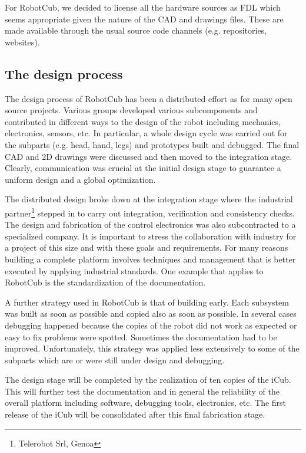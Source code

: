 For RobotCub, we decided to license all the hardware sources as FDL which seems
appropriate given the nature of the CAD and drawings files. These are made 
available through the usual source code channels (e.g. repositories, websites).

\subsection{The design process}
The design process of RobotCub has been a distributed effort as for many open
source projects. Various groups developed various subcomponents and contributed in
different ways to the design of the robot including mechanics, electronics, sensors, 
etc. In particular, a whole design cycle was carried out for the subparts (e.g.
head, hand, legs) and prototypes built and debugged. The final CAD and 2D drawings 
were discussed and then moved to the integration stage. Clearly, communication
was crucial at the initial design stage to guarantee a uniform design and a
global optimization.

The distributed design broke down at the integration stage where the industrial 
partner\footnote{Telerobot Srl, Genoa} stepped in to carry out integration, 
verification and consistency checks. The design and fabrication of the control 
electronics was also subcontracted to a specialized company.
It is important to stress the collaboration with industry for a project of this
size and with these goals and requirements. For many reasons building a complete 
platform involves techniques and management that is better executed by applying 
industrial standards. One example that applies to RobotCub is the standardization 
of the documentation.

A further strategy used in RobotCub is that of building early. Each subsystem
was built as soon as possible and copied also as soon as possible. In several cases
debugging happened because the copies of the robot did not work as expected or
easy to fix problems were spotted. Sometimes the documentation had to be improved.
Unfortunately, this strategy was applied less extensively to some of the subparts 
which are or were still under design and debugging. 

The design stage will be completed by the realization of ten copies of the iCub.
This will further test the documentation and in general the reliability of the
overall platform including software, debugging tools, electronics, etc. The first
release of the iCub will be consolidated after this final fabrication stage.

